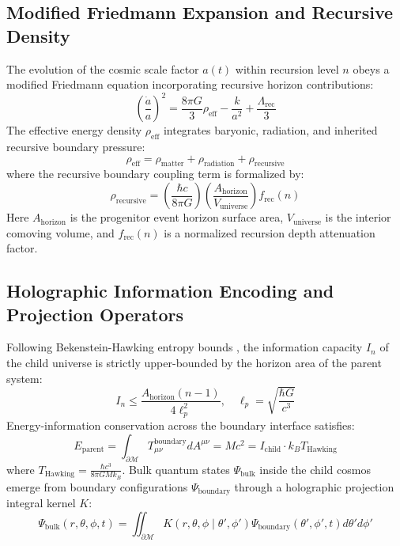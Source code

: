 \documentclass[11pt,a4paper]{article}
\begin{document}
\subsection{Modified Friedmann Expansion and Recursive Density}
The evolution of the cosmic scale factor $a(t)$ within recursion level $n$ obeys a modified Friedmann equation incorporating recursive horizon contributions:
\begin{equation}
\left(\frac{\dot{a}}{a}\right)^2 = \frac{8\pi G}{3} \rho_{\text{eff}} - \frac{k}{a^2} + \frac{\Lambda_{\text{rec}}}{3}
\end{equation}
The effective energy density $\rho_{\text{eff}}$ integrates baryonic, radiation, and inherited recursive boundary pressure:
\begin{equation}
\rho_{\text{eff}} = \rho_{\text{matter}} + \rho_{\text{radiation}} + \rho_{\text{recursive}}
\end{equation}
where the recursive boundary coupling term is formalized by:
\begin{equation}
\rho_{\text{recursive}} = \left(\frac{\hbar c}{8\pi G}\right) \left(\frac{A_{\text{horizon}}}{V_{\text{universe}}}\right) f_{\text{rec}}(n)
\end{equation}
Here $A_{\text{horizon}}$ is the progenitor event horizon surface area, $V_{\text{universe}}$ is the interior comoving volume, and $f_{\text{rec}}(n)$ is a normalized recursion depth attenuation factor.

\subsection{Holographic Information Encoding and Projection Operators}
Following Bekenstein-Hawking entropy bounds \cite{hawking1975particle, thooft1993dimensional, susskind1995world}, the information capacity $I_n$ of the child universe is strictly upper-bounded by the horizon area of the parent system:
\begin{equation}
I_n \le \frac{A_{\text{horizon}}(n-1)}{4 \ell_p^2}, \quad \ell_p = \sqrt{\frac{\hbar G}{c^3}}
\end{equation}
Energy-information conservation across the boundary interface satisfies:
\begin{equation}
E_{\text{parent}} = \int_{\partial \mathcal{M}} T_{\mu\nu}^{\text{boundary}} dA^{\mu\nu} = M c^2 = I_{\text{child}} \cdot k_B T_{\text{Hawking}}
\end{equation}
where $T_{\text{Hawking}} = \frac{\hbar c^3}{8\pi G M k_B}$. Bulk quantum states $\Psi_{\text{bulk}}$ inside the child cosmos emerge from boundary configurations $\Psi_{\text{boundary}}$ through a holographic projection integral kernel $K$:
\begin{equation}
\Psi_{\text{bulk}}(r, \theta, \phi, t) = \iint_{\partial \mathcal{M}} K(r, \theta, \phi \mid \theta', \phi') \Psi_{\text{boundary}}(\theta', \phi', t) d\theta' d\phi'
\end{equation}
\end{document}
